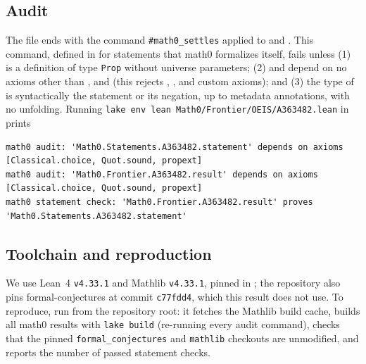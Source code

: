 \documentclass[11pt]{amsart}
\theoremstyle{plain}
\theoremstyle{definition}
\begin{document}
\subsection*{Audit}
The file ends with the command \texttt{\#math0\_settles} applied to  and . This command, defined in  for statements that math0 formalizes itself, fails unless (1)  is a definition of type \texttt{Prop} without universe parameters; (2)  and  depend on no axioms other than ,  and  (this rejects , ,  and custom axioms); and (3) the type of  is syntactically the statement or its negation, up to metadata annotations, with no unfolding. Running \texttt{lake env lean Math0/Frontier/OEIS/A363482.lean} in  prints
\begin{lstlisting}
math0 audit: 'Math0.Statements.A363482.statement' depends on axioms [Classical.choice, Quot.sound, propext]
math0 audit: 'Math0.Frontier.A363482.result' depends on axioms [Classical.choice, Quot.sound, propext]
math0 statement check: 'Math0.Frontier.A363482.result' proves 'Math0.Statements.A363482.statement'
\end{lstlisting}

\subsection*{Toolchain and reproduction}
We use Lean~4 \cite{Lean4} \texttt{v4.33.1} and Mathlib \cite{Mathlib} \texttt{v4.33.1}, pinned in ; the repository also pins formal-conjectures \cite{FC} at commit \texttt{c77fdd4}, which this result does not use.
To reproduce, run  from the repository root: it fetches the Mathlib build cache, builds all math0 results with \texttt{lake build} (re-running every audit command), checks that the pinned \texttt{formal\_conjectures} and \texttt{mathlib} checkouts are unmodified, and reports the number of passed statement checks.
\end{document}
